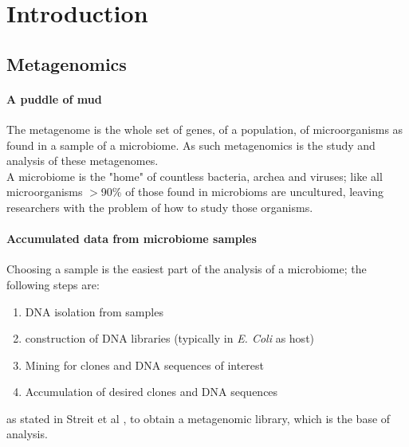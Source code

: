 \documentclass[twocolumn]{bmcart}%
\begin{document}

\section*{Introduction}
\subsection*{Metagenomics}
\paragraph*{A puddle of mud}
The metagenome is the whole set of genes, of a population, of microorganisms as found in a sample of a microbiome. As such metagenomics is the study and analysis of these metagenomes.\cite{handelsman2004metagenomics}\\
A microbiome is the "home" of countless bacteria, archea and viruses; like all microorganisms $>$90\% of those found in microbioms are uncultured, leaving researchers with the problem of how to study those organisms.
\paragraph*{Accumulated data from microbiome samples}
Choosing a sample is the easiest part of the analysis of a microbiome; the following steps are:\\
\begin{enumerate}
	\item DNA isolation from samples
	\item construction of DNA libraries (typically in \textit{E. Coli} as host)
	\item Mining for clones and DNA sequences of interest
	\item Accumulation of desired clones and DNA sequences
\end{enumerate}
as stated in Streit et al \cite{STREIT2004492}, to obtain a metagenomic library, which is the base of analysis.\\
\end{document}
